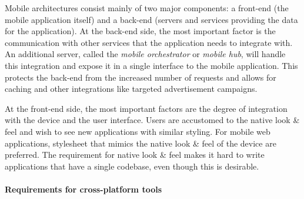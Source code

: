 Mobile architectures consist mainly of two major components: a front-end (the mobile application itself) and a back-end (servers and services providing the data for the application). At the back-end side, the most important factor is the communication with other services that the application needs to integrate with. An additional server, called the \emph{mobile orchestrator} or \emph{mobile hub}, will handle this integration and expose it in a single interface to the mobile application. This protects the back-end from the increased number of requests and allows for caching and other integrations like targeted advertisement campaigns.

At the front-end side, the most important factors are the degree of integration with the device and the user interface. Users are accustomed to the native look \& feel and wish to see new applications with similar styling. For mobile web applications, stylesheet that mimics the native look \& feel of the device are preferred. The requirement for native look \& feel makes it hard to write applications that have a single codebase, even though this is desirable. 

\paragraph{Requirements for cross-platform tools}

